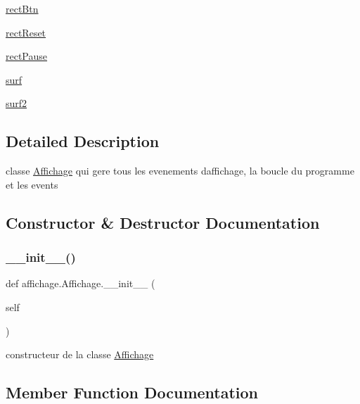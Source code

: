 \begin{DoxyCompactItemize}
\item 
\hyperlink{classaffichage_1_1_affichage_a405ae54162563c87555fb65fb94197c4}{rect\+Btn}
\item 
\hyperlink{classaffichage_1_1_affichage_a5267ea26272e476c5455abf137d1d363}{rect\+Reset}
\item 
\hyperlink{classaffichage_1_1_affichage_adfc1a639d0d90c153f4bd420209bd6b3}{rect\+Pause}
\item 
\hyperlink{classaffichage_1_1_affichage_a78a7280c311729f4dbb9a3934d1fb712}{surf}
\item 
\hyperlink{classaffichage_1_1_affichage_ad48d66124db12193345d9dee2040fe33}{surf2}
\end{DoxyCompactItemize}


\subsection{Detailed Description}
classe \hyperlink{classaffichage_1_1_affichage}{Affichage} qui gere tous les evenements d\textquotesingle{}affichage, la boucle du programme et les events 

\subsection{Constructor \& Destructor Documentation}
\mbox{\label{classaffichage_1_1_affichage_af97834b8341cdefdf301ece9163f1ee7}} 
\subsubsection{\texorpdfstring{\+\_\+\+\_\+init\+\_\+\+\_\+()}{\_\_init\_\_()}}
{\footnotesize\ttfamily def affichage.\+Affichage.\+\_\+\+\_\+init\+\_\+\+\_\+ (\begin{DoxyParamCaption}\item[{}]{self }\end{DoxyParamCaption})}



constructeur de la classe \hyperlink{classaffichage_1_1_affichage}{Affichage} 



\subsection{Member Function Documentation}
\mbox{\label{classaffichage_1_1_affichage_a33fa9c0044828bb8e177f36ac7927921}} 
